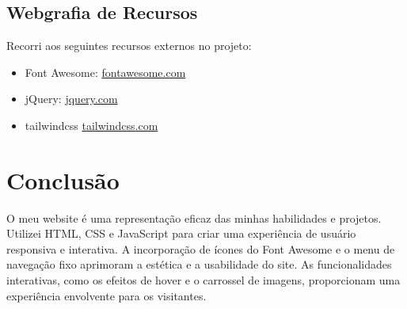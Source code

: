 \documentclass{article}
\begin{document}
\subsection{Webgrafia de Recursos}
Recorri aos seguintes recursos externos no projeto:

\begin{itemize}
    \item Font Awesome: \url{fontawesome.com}
    \item jQuery: \url{jquery.com}
    \item tailwindcss \url{tailwindcss.com}
\end{itemize}

\section{Conclusão}
O meu website é uma representação eficaz das minhas habilidades e projetos. Utilizei HTML, CSS e JavaScript para criar uma experiência de usuário responsiva e interativa. A incorporação de ícones do Font Awesome e o menu de navegação fixo aprimoram a estética e a usabilidade do site. As funcionalidades interativas, como os efeitos de hover e o carrossel de imagens, proporcionam uma experiência envolvente para os visitantes.
\end{document}
